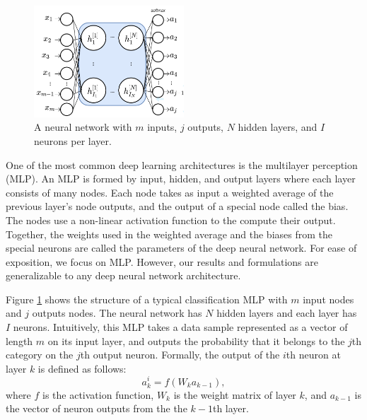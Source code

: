 \documentclass[conference]{IEEEtran}
\begin{document}
\begin{figure}[t]
\centering
\includegraphics[width=0.5\textwidth, keepaspectratio]{SimpleNN}
\caption{A neural network with $m$ inputs, $j$ outputs,  $N$  hidden layers, and $I$ neurons per layer.}
\label{fig:SimplNN}
\end{figure}
One of the most common deep learning architectures is the multilayer perception (MLP). 
An MLP is formed by input, hidden, and output layers where each layer consists of many nodes. Each node takes 
as input a weighted average of the previous layer's node outputs, and the output of a special node called the bias.  
The nodes use a non-linear activation function to the compute their output. Together, the weights used in the weighted average and
the biases from the special neurons are called the parameters of the deep neural network. 
For ease of exposition, we focus on MLP. However, our results and formulations are generalizable to any deep neural network
architecture. 




Figure \ref{fig:SimplNN} shows the structure of a typical classification MLP with $m$ input nodes and $j$ outputs nodes. The neural network
has $N$ hidden layers and each layer has $I$ neurons. Intuitively, this MLP takes a data sample represented as a vector of length
$m$ on its input layer, and outputs the probability that it belongs to the $j$th category on the $j$th output neuron.
Formally, the output of the $i$th neuron at layer $k$ is defined as follows:
$$a^i_k=f(W_k a_{k-1}),$$
where $f$ is the activation function, $W_k$ is the weight matrix of layer $k$,
and $a_{k-1}$ is the vector of neuron outputs from the the $k-1$th layer. 
\end{document}
